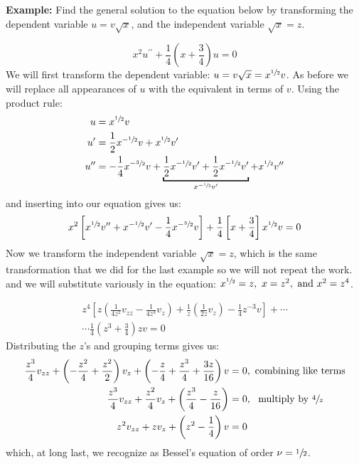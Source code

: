 \vspace{1.0cm}

\noindent\textbf{Example: }Find the general solution to the equation below by transforming the dependent variable $u = v\sqrt{x}$, and the independent variable $\sqrt{x} = z$.

\begin{equation*}
x^2u^{\prime \prime}+\frac{1}{4}\left(x+\frac{3}{4}\right)u = 0
\end{equation*}
\noindent We will first transform the dependent variable: $u=v\sqrt{x} = x^{\sfrac{1}{2}}v$.  As before we will replace all appearances of $u$ with the equivalent in terms of $v$.  Using the product rule:
\begin{align*}
u &= x^{\sfrac{1}{2}}v \\
u^{\prime} &= \frac{1}{2}x^{-\sfrac{1}{2}}v + x^{\sfrac{1}{2}}v^{\prime} \\
u^{\prime \prime} &= -\frac{1}{4}x^{-\sfrac{3}{2}}v+\underbracket{\frac{1}{2}x^{-\sfrac{1}{2}}v^{\prime} + \frac{1}{2}x^{-\sfrac{1}{2}}v^{\prime}}_{x^{-\sfrac{1}{2}}v^{\prime}}+x^{\sfrac{1}{2}}v^{\prime \prime}
\end{align*}
and inserting into our equation gives us:
\begin{equation*}
x^2\left[x^{\sfrac{1}{2}}v^{\prime \prime}+x^{-\sfrac{1}{2}}v^{\prime}-\frac{1}{4}x^{-\sfrac{3}{2}}v \right] + \frac{1}{4}\left[x+\frac{3}{4}\right]x^{\sfrac{1}{2}}v = 0
\end{equation*}
Now we transform the independent variable $\sqrt{x} = z$, which is the same transformation that we did for the last example so we will not repeat the work. and we will substitute variously in the equation: $x^{\sfrac{1}{2}}=z, \ x=z^2, \ \text{and }x^2=z^4$. 

\begin{multline*}
z^4\left[ z\left(\frac{1}{4z^2}v_{zz}-\frac{1}{4z^3}v_z\right) + \frac{1}{z}\left(\frac{1}{2z}v_z \right)-\frac{1}{4}z^{-3}v\right]+ \cdots \\
\cdots \frac{1}{4}\left(z^3+\frac{3}{4}\right)zv = 0 
\end{multline*}
Distributing the $z$'s and grouping terms gives us:
\begin{align*}
\frac{z^3}{4}v_{zz}+\left(-\frac{z^2}{4}+\frac{z^2}{2} \right)v_z + \left(-\frac{z}{4}+\frac{z^3}{4}+\frac{3z}{16}\right)v &= 0, \text{ combining like terms}\\
\frac{z^3}{4}v_{zz}+\frac{z^2}{4}v_z + \left(\frac{z^3}{4}-\frac{z}{16} \right) &= 0, \ \text{ multiply by }\sfrac{4}{z} \\
z^2v_{zz}+zv_z+\left(z^2-\frac{1}{4}\right)v &= 0
\end{align*}
which, at long last, we recognize as Bessel's equation of order $\nu = \sfrac{1}{2}$.


